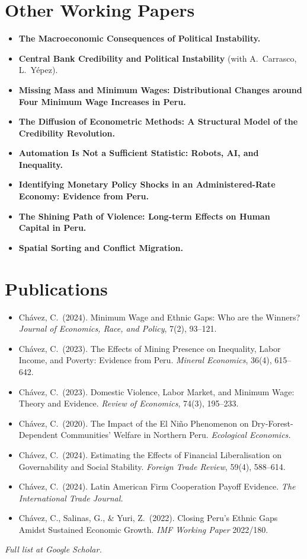 \documentclass[11pt]{article}
\begin{document}
\section{Other Working Papers}
\begin{itemize}
\item \textbf{The Macroeconomic Consequences of Political Instability.}
\item \textbf{Central Bank Credibility and Political Instability} (with A.\ Carrasco, L.\ Y\'epez).
\item \textbf{Missing Mass and Minimum Wages: Distributional Changes around Four Minimum Wage Increases in Peru.}
\item \textbf{The Diffusion of Econometric Methods: A Structural Model of the Credibility Revolution.}
\item \textbf{Automation Is Not a Sufficient Statistic: Robots, AI, and Inequality.}
\item \textbf{Identifying Monetary Policy Shocks in an Administered-Rate Economy: Evidence from Peru.}
\item \textbf{The Shining Path of Violence: Long-term Effects on Human Capital in Peru.}
\item \textbf{Spatial Sorting and Conflict Migration.}
\end{itemize}

\section{Publications}
\begin{itemize}
\item Chávez, C.\ (2024). Minimum Wage and Ethnic Gaps: Who are the Winners? \textit{Journal of Economics, Race, and Policy}, 7(2), 93--121.
\item Chávez, C.\ (2023). The Effects of Mining Presence on Inequality, Labor Income, and Poverty: Evidence from Peru. \textit{Mineral Economics}, 36(4), 615--642.
\item Chávez, C.\ (2023). Domestic Violence, Labor Market, and Minimum Wage: Theory and Evidence. \textit{Review of Economics}, 74(3), 195--233.
\item Chávez, C.\ (2020). The Impact of the El Niño Phenomenon on Dry-Forest-Dependent Communities' Welfare in Northern Peru. \textit{Ecological Economics.}
\item Chávez, C.\ (2024). Estimating the Effects of Financial Liberalisation on Governability and Social Stability. \textit{Foreign Trade Review}, 59(4), 588--614.
\item Chávez, C.\ (2024). Latin American Firm Cooperation Payoff Evidence. \textit{The International Trade Journal.}
\item Chávez, C., Salinas, G., \& Yuri, Z.\ (2022). Closing Peru's Ethnic Gaps Amidst Sustained Economic Growth. \textit{IMF Working Paper} 2022/180.
\end{itemize}
\textit{Full list at Google Scholar.}
\end{document}
